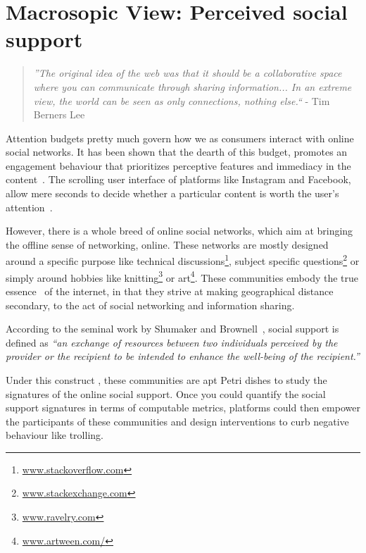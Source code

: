 
\chapter{Macrosopic View: Perceived social support }

\label{chap:Utility_support}
\graphicspath{{Chapter3/plots/} {Chapter3/plots}}
\begin{quote}
    \textit{''The original idea of the web was that it should be a collaborative space where you can communicate through sharing information... In an extreme view, the world can be seen as only connections, nothing else.``} - Tim Berners Lee\cite{berners2001weaving} 
\end{quote}
Attention budgets pretty much govern how we as consumers interact with online social networks. It has been shown that the dearth of this budget, promotes an engagement behaviour that prioritizes perceptive features and immediacy in the content~\cite{joglekar2017like}. The scrolling user interface of platforms like Instagram and Facebook, allow mere seconds to decide whether a particular content is worth the user's attention~\cite{eikelboom2017irresistible}. 

However, there is a whole breed of online social networks, which aim at bringing the offline sense of networking, online. These networks are mostly designed around a specific purpose like technical discussions\footnote{\url{www.stackoverflow.com}}, subject specific questions\footnote{\url{www.stackexchange.com}} or simply around hobbies like knitting\footnote{\url{www.ravelry.com}} or art\footnote{\url{www.artween.com/}}. These communities embody the true essence~\cite{berners2001weaving} of the internet, in that they strive at making geographical distance secondary, to the act of social networking and information sharing.
\begin{definition}
    According to the seminal work by Shumaker and Brownell~\cite{shumaker1984toward}, social support is defined as \textsl{``an exchange of resources between two individuals perceived by the provider or the recipient to be intended to enhance the well-being of the recipient.''}
    \label{def:support}
\end{definition}

Under this construct , these communities are apt Petri dishes to study the signatures of the online social support. Once you could quantify the social support signatures in terms of computable metrics, platforms could then empower the participants of these communities and design interventions to curb negative behaviour like trolling.

